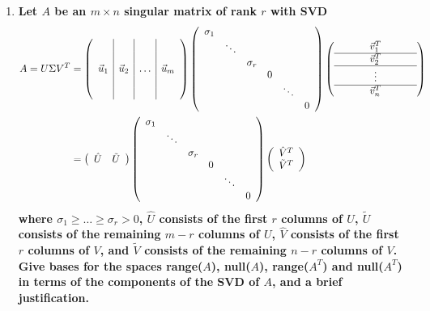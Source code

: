 \documentclass[12pt, oneside]{article}   	%
\begin{document}
\begin{enumerate}
	
	\item \textbf{Let $A$ be an $m \times n$ singular matrix of rank $r$ with SVD
	\begin{align*}
	A = U \Sigma V^T &= 
	\left( \begin{array}{c|c|c|c} &&& \\ &&& \\ \vec{u}_1 & \vec{u}_2 & \ldots & \vec{u}_m \\ &&& \\ &&&  \end{array} \right)
	\left( \begin{array}{cccccc} \sigma_1 &&&&& \\ & \ddots &&&& \\ && \sigma_r &&& \\ &&& 0 &&\\ &&&& \ddots &\\  &&&&& 0 \end{array} \right)
	\left( \begin{array}{ccccccc} &&& \vec{v}_1^T &&& \\ \hline &&& \vec{v}_2^T &&& \\ \hline &&& \vdots &&& \\ \hline &&&
	\vec{v}_n^T &&&  \end{array} \right) \\
	& = \left( \begin{array}{cc} \hat{U} & \tilde{U} \end{array} \right) 
	\left( \begin{array}{cccccc} \sigma_1 &&&&& \\ & \ddots &&&& \\ && \sigma_r &&& \\ &&& 0 &&\\ &&&& \ddots &\\  &&&&& 0 \end{array} \right)
	\left( \begin{array}{c} \hat{V}^T \\ \tilde{V}^T \end{array} \right) \\
	\end{align*}
	where $\sigma_1 \geq  \ldots \geq \sigma_r > 0$, $\hat{U}$ consists of the first $r$ columns of $U$, $\tilde{U}$ consists of the remaining $m-r$ columns of $U$,
	$\hat{V}$ consists of the first $r$ columns of $V$, and $\tilde{V}$ consists of the remaining $n-r$ columns of $V$.
	Give bases for the spaces range($A$), null($A$), range($A^T$) and null($A^T$) in terms of the components of the SVD of
	$A$, and a brief justification.}\\
	

\end{enumerate}
\end{document}
